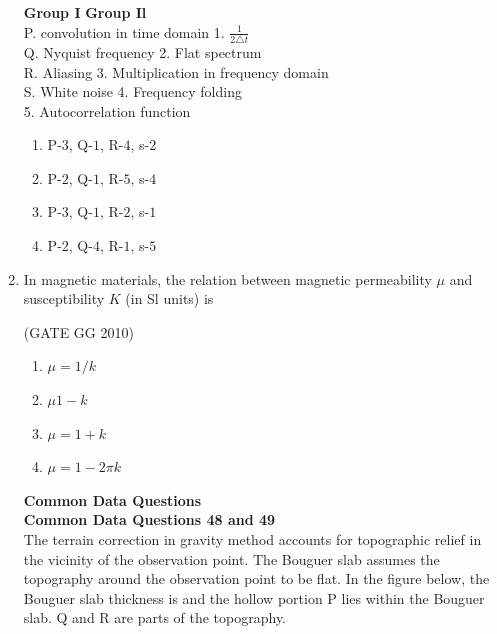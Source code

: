 \documentclass[journal]{IEEEtran}
\begin{document}
\begin{enumerate}[start=26]
\vspace{0cm}
\textbf{Group I} \hspace{4.4cm}
\textbf{Group Il}\\
P. convolution in time domain \quad \quad \quad \quad \hspace{0.2cm}1. $\frac{1}{2\triangle t}$\\
Q. Nyquist frequency \qquad \qquad \qquad \qquad \hspace{0.05cm}2. Flat spectrum\\
R. Aliasing \qquad \qquad \qquad \qquad \hspace{1.5cm}3. Multiplication in frequency domain\\
S. White noise \qquad \qquad \qquad \qquad \hspace{0.9cm} 4. Frequency folding\\
\hspace*{6cm} 5. Autocorrelation function
\begin{enumerate}
    \item P-$3$, Q-$1$, R-$4$, s-$2$
    \item P-$2$, Q-$1$, R-$5$, s-$4$
     \item P-$3$, Q-$1$, R-$2$, s-$1$
      \item P-$2$, Q-$4$, R-$1$, s-$5$
\end{enumerate}

\item In magnetic materials, the relation between magnetic permeability $\mu$ and susceptibility $K$ (in Sl units) is

\hfill{(GATE GG 2010)}

\begin{enumerate}
    \item $\mu =1/k$
    \item $\mu 1-k$
    \item $\mu=1+k$
    \item $\mu=1-2\pi k$
\end{enumerate}
\vspace{0.7cm}
\textbf{Common Data Questions}\\
\vspace{0.6cm}
\textbf{Common Data Questions 48 and 49}\\
The terrain correction in gravity method accounts for topographic relief in the vicinity of the observation point. The Bouguer slab assumes the topography around the observation point to be flat. In the figure below, the Bouguer slab thickness is and the hollow portion P lies within the Bouguer slab. Q and R are parts of the topography.


\end{enumerate}
\end{document}
